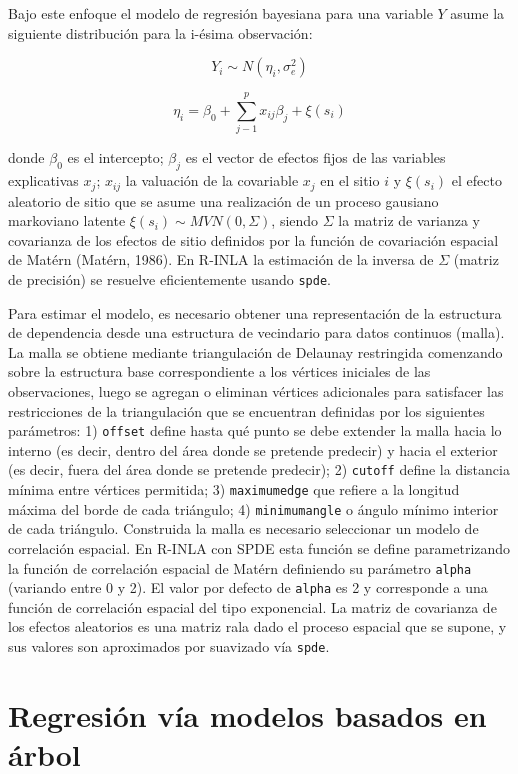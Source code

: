 \documentclass[11pt,b5paper,]{krantz}
\begin{document}
Bajo este enfoque el modelo de regresión bayesiana para una variable \(Y\) asume la siguiente distribución para la i-ésima observación:

\[Y_i\sim N(\eta_i,\sigma_e^2)\]

\[\eta_i = \beta_0 + \sum_{j-1}^{p} {x_{ij}\beta_j}+ \xi(s_i)\]

donde \(\beta_0\) es el intercepto; \(\beta_j\) es el vector de efectos fijos de las variables explicativas \(x_j\); \(x_{ij}\) la valuación de la covariable \(x_j\) en el sitio \(i\) y \(\xi(s_i)\) el efecto aleatorio de sitio que se asume una realización de un proceso gausiano markoviano latente \(\xi(s_i) \sim MVN(0,\Sigma)\), siendo \(\Sigma\) la matriz de varianza y covarianza de los efectos de sitio definidos por la función de covariación espacial de Matérn (Matérn, 1986). En R-INLA la estimación de la inversa de \(\Sigma\) (matriz de precisión) se resuelve eficientemente usando \texttt{spde}.

Para estimar el modelo, es necesario obtener una representación de la estructura de dependencia desde una estructura de vecindario para datos continuos (malla). La malla se obtiene mediante triangulación de Delaunay restringida comenzando sobre la estructura base correspondiente a los vértices iniciales de las observaciones, luego se agregan o eliminan vértices adicionales para satisfacer las restricciones de la triangulación que se encuentran definidas por los siguientes parámetros: 1) \texttt{offset} define hasta qué punto se debe extender la malla hacia lo interno (es decir, dentro del área donde se pretende predecir) y hacia el exterior (es decir, fuera del área donde se pretende predecir); 2) \texttt{cutoff} define la distancia mínima entre vértices permitida; 3) \texttt{maximumedge} que refiere a la longitud máxima del borde de cada triángulo; 4) \texttt{minimumangle} o ángulo mínimo interior de cada triángulo. Construida la malla es necesario seleccionar un modelo de correlación espacial. En R-INLA con SPDE esta función se define parametrizando la función de correlación espacial de Matérn definiendo su parámetro \texttt{alpha} (variando entre 0 y 2). El valor por defecto de \texttt{alpha} es 2 y corresponde a una función de correlación espacial del tipo exponencial. La matriz de covarianza de los efectos aleatorios es una matriz rala dado el proceso espacial que se supone, y sus valores son aproximados por suavizado vía \texttt{spde}.

\hypertarget{regresiuxf3n-vuxeda-modelos-basados-en-uxe1rbol}{%
\section{Regresión vía modelos basados en árbol}\label{regresiuxf3n-vuxeda-modelos-basados-en-uxe1rbol}}
\end{document}
